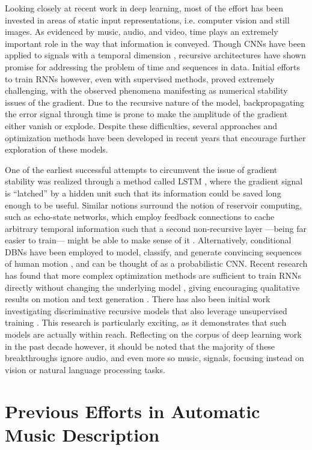Looking closely at recent work in deep learning, most of the effort has been invested in areas of static input representations, i.e. computer vision and still images.
As evidenced by music, audio, and video, time plays an extremely important role in the way that information is conveyed.
Though CNNs have been applied to signals with a temporal dimension \cite{LeCun1994}, recursive architectures have shown promise for addressing the problem of time and sequences in data.
Initial efforts to train RNNs however, even with supervised methods, proved extremely challenging, with the observed phenomena manifesting as numerical stability issues of the gradient.
Due to the recursive nature of the model, backpropagating the error signal through time is prone to make the amplitude of the gradient either vanish or explode.
Despite these difficulties, several approaches and optimization methods have been developed in recent years that encourage further exploration of these models.

One of the earliest successful attempts to circumvent the issue of gradient stability was realized through a method called LSTM \cite{Schmidhuber1997}, where the gradient signal is ``latched'' by a hidden unit such that its information could be saved long enough to be useful.
Similar notions surround the notion of reservoir computing, such as echo-state networks, which employ feedback connections to cache arbitrary temporal information such that a second non-recursive layer ---being far easier to train--- might be able to make sense of it \cite{Jaeger2002}.
Alternatively, conditional DBNs have been employed to model, classify, and generate convincing sequences of human motion \cite{JMLR2011}, and can be thought of as a probabilistic CNN.
Recent research has found that more complex optimization methods are sufficient to train RNNs directly without changing the underlying model \cite{Martens2010}, giving encouraging qualitative results on motion \cite{Sutskever2008} and text generation \cite{Sutskever2011}.
There has also been initial work investigating discriminative recursive models that also leverage unsupervised training \cite{Rolfe2013}.
This research is particularly exciting, as it demonstrates that such models are actually within reach.
Reflecting on the corpus of deep learning work in the past decade however, it should be noted that the majority of these breakthroughs ignore audio, and even more so music, signals, focusing instead on vision or natural language processing tasks.


\section{Previous Efforts in Automatic Music Description}

